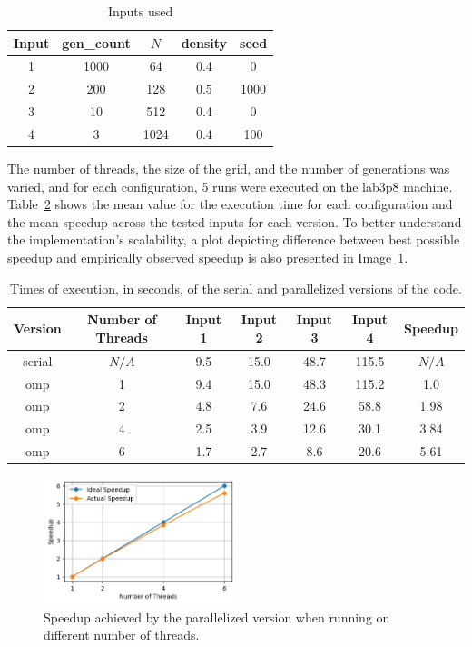 \documentclass{article}
\begin{document}
\begin{table}[h!]
	\centering
	\begin{tabular}{||c c c c c||} 
	 \hline
	 Input & gen\_count & $N$ & density & seed  \\ [0.5ex] 
	 \hline\hline
	 1 & 1000 & 64 & 0.4 & 0 \\ 
	 2 & 200 & 128 & 0.5 & 1000 \\
	 3 & 10 & 512 & 0.4 & 0 \\ 
	 4 & 3 & 1024 & 0.4 & 100 \\ [1ex] 
	 \hline
	\end{tabular}
	\caption{Inputs used}
	\label{input-values}
\end{table}

The number of threads, the size of the grid, and the number of generations
was varied, and for each configuration, 5 runs were executed on the lab3p8
machine. Table~\ref{execution-times} shows the mean value for the execution
time for each configuration and the mean speedup across the tested inputs for
each version. To better understand the implementation's scalability, a plot
depicting difference between best possible speedup and empirically observed
speedup is also presented in Image~\ref{speedup}.

\begin{table}[h!]
	\centering
	\begin{tabular}{||c c c c c c c||} 
	 \hline
	 Version & Number of Threads & Input 1 & Input 2 & Input 3 & Input 4 & Speedup\\ [0.5ex] 
	 \hline\hline
	 serial & $N/A$ & 9.5 & 15.0 & 48.7 & 115.5 & $N/A$ \\ 
	 omp & 1 & 9.4 & 15.0 & 48.3 & 115.2 & 1.0 \\ 
	 omp & 2 & 4.8 & 7.6 & 24.6 & 58.8 & 1.98 \\
	 omp & 4 & 2.5 & 3.9 & 12.6 & 30.1 & 3.84 \\
	 omp & 6 & 1.7 & 2.7 & 8.6 & 20.6 & 5.61 \\ [1ex] 
	 \hline
	\end{tabular}
	\caption{Times of execution, in seconds, of the serial and parallelized versions of the code.}
	\label{execution-times}
\end{table}

\begin{figure}[htbp]
    \centering
    \includegraphics[width=0.5\textwidth]{img/speedup-threads.png}
    \caption{Speedup achieved by the parallelized version when running on different number of threads.}
    \label{speedup}
\end{figure}
\end{document}
